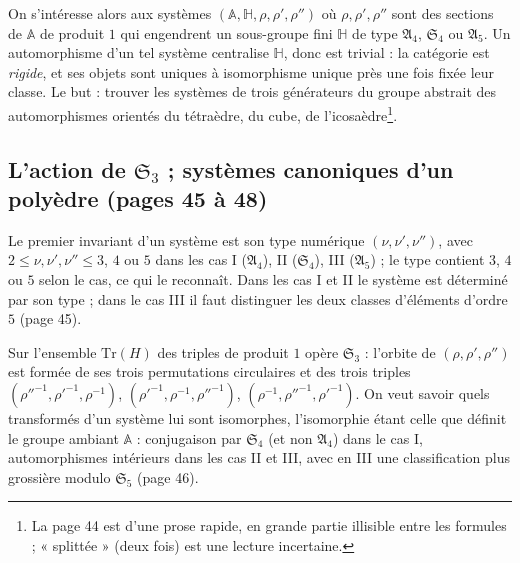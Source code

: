 \documentclass[11pt,a4paper]{article}
\begin{document}
On s'intéresse alors aux systèmes $(\mathbb{A}, \mathbb{H}, \rho, \rho',
\rho'')$ où $\rho, \rho', \rho''$ sont des sections de $\mathbb{A}$ de produit
$1$ qui engendrent un sous-groupe fini $\mathbb{H}$ de type $\mathfrak{A}_4$,
$\mathfrak{S}_4$ ou $\mathfrak{A}_5$. Un automorphisme d'un tel système
centralise $\mathbb{H}$, donc est trivial : la catégorie est \emph{rigide}, et
ses objets sont uniques à isomorphisme unique près une fois fixée leur classe.
Le but : trouver les systèmes de trois générateurs du groupe abstrait des
automorphismes orientés du tétraèdre, du cube, de l'icosaèdre\footnote{La page
44 est d'une prose rapide, en grande partie illisible entre les formules ;
« splittée » (deux fois) est une lecture incertaine.}.

\subsection*{L'action de $\mathfrak{S}_3$ ; systèmes canoniques d'un polyèdre (pages 45 à 48)}

Le premier invariant d'un système est son type numérique $(\nu, \nu',
\nu'')$, avec $2 \leq \nu, \nu', \nu'' \leq 3$, $4$ ou $5$ dans les cas I
($\mathfrak{A}_4$), II ($\mathfrak{S}_4$), III ($\mathfrak{A}_5$) ; le type
contient $3$, $4$ ou $5$ selon le cas, ce qui le reconnaît. Dans les cas I et
II le système est déterminé par son type ; dans le cas III il faut distinguer
les deux classes d'éléments d'ordre $5$ (page 45).

Sur l'ensemble $\mathrm{Tr}(H)$ des triples de produit $1$ opère
$\mathfrak{S}_3$ : l'orbite de $(\rho, \rho', \rho'')$ est formée de ses trois
permutations circulaires et des trois triples $(\rho''^{-1}, \rho'^{-1},
\rho^{-1})$, $(\rho'^{-1}, \rho^{-1}, \rho''^{-1})$, $(\rho^{-1}, \rho''^{-1},
\rho'^{-1})$. On veut savoir quels transformés d'un système lui sont
isomorphes, l'isomorphie étant celle que définit le groupe ambiant
$\mathbb{A}$ : conjugaison par $\mathfrak{S}_4$ (et non $\mathfrak{A}_4$) dans le
cas I, automorphismes intérieurs dans les cas II et III, avec en III une
classification plus grossière modulo $\mathfrak{S}_5$ (page 46).
\end{document}

